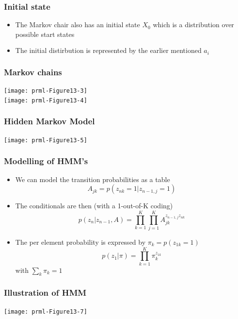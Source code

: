 \documentclass[10pt]{beamer}
\begin{document}
\begin{frame}
  \frametitle{Initial state}
  \begin{itemize}
  \item The Markov chair also has an initial state $X_0$ which is a
    distribution over possible start states
  \item The initial distirbution is represented by the earlier mentioned $a_i$
  \end{itemize}
\end{frame}


\begin{frame}
  \frametitle{Markov chains}
  \begin{center}
    \texttt{[image: prml-Figure13-3]}\\[2cm]

    \texttt{[image: prml-Figure13-4]}
  \end{center}
\end{frame}


\begin{frame}
  \frametitle{Hidden Markov Model}
  \begin{center}
    \texttt{[image: prml-Figure13-5]}
  \end{center}
\end{frame}



\begin{frame}
  \frametitle{Modelling of HMM's}
  \begin{itemize}
  \item We can model the transition probabilities as a table
    \[
    A_{jk} = p(z_{nk} = 1 | z_{n-1,j} = 1)
    \]
  \item The conditionals are then (with a 1-out-of-K coding)
    \[
    p(z_n|z_{n-1},A) = \prod_{k=1}^K\prod_{j=1}^K A_{jk}^{z_{n-1,j} z_{nk}}
    \]
  \item The per element probability is expressed by $\pi_k =
    p(z_{1k}=1)$
    \[
    p(z_1 | \pi) = \prod_{k=1}^K \pi_k^{z_{1k}}
    \] with $\sum_k \pi_k = 1$
  \end{itemize}
\end{frame}

\begin{frame}
  \frametitle{Illustration of HMM}
  \begin{center}
    \texttt{[image: prml-Figure13-7]}
  \end{center}
\end{frame}
\end{document}
